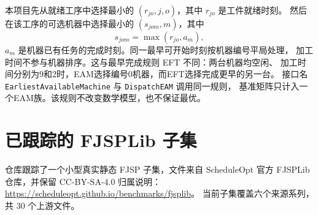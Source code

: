 ﻿\documentclass[11pt]{ctexart}
\begin{document}
本项目先从就绪工序中选择最小的 $(r_{jo},j,o)$，其中 $r_{jo}$ 是工件就绪时刻。
然后在该工序的可选机器中选择最小的 $(s_{jom},m)$，其中
\[
s_{jom}=\max(r_{jo},a_m),
\]
$a_m$ 是机器已有任务的完成时刻。同一最早可开始时刻按机器编号平局处理，
加工时间不参与机器排序。这与最早完成规则 EFT 不同：两台机器均空闲、
加工时间分别为9和2时，EAM选择编号0机器，而EFT选择完成更早的另一台。
接口名 \texttt{EarliestAvailableMachine} 与 \texttt{DispatchEAM} 调用同一规则，
基准矩阵只计入一个EAM族。该规则不改变数学模型，也不保证最优。

\section{已跟踪的 FJSPLib 子集}

仓库跟踪了一个小型真实静态 FJSP 子集，文件来自 ScheduleOpt 官方 FJSPLib
仓库，并保留 CC-BY-SA-4.0 归属说明：
\url{https://scheduleopt.github.io/benchmarks/fjsplib}。
当前子集覆盖六个来源系列，共 30 个上游文件。
\end{document}
